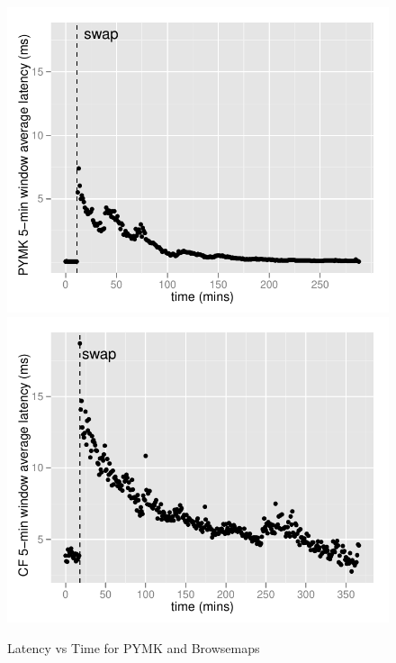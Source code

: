 \begin{figure}
  \centering
    \includegraphics[scale=0.55]{images/pymk_search.pdf}
    \includegraphics[scale=0.55]{images/browsemap_search.pdf}
  \caption{Latency vs Time for PYMK and Browsemaps}
  \label{production}
\end{figure}



